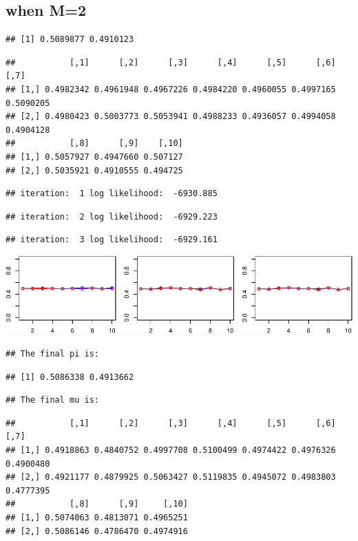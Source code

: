 \documentclass[
]{article}
\begin{document}
\hypertarget{when-m2}{%
\subsection{when M=2}\label{when-m2}}

\begin{verbatim}
## [1] 0.5089877 0.4910123
\end{verbatim}

\begin{verbatim}
##           [,1]      [,2]      [,3]      [,4]      [,5]      [,6]      [,7]
## [1,] 0.4982342 0.4961948 0.4967226 0.4984220 0.4960055 0.4997165 0.5090205
## [2,] 0.4980423 0.5003773 0.5053941 0.4988233 0.4936057 0.4994058 0.4904128
##           [,8]      [,9]    [,10]
## [1,] 0.5057927 0.4947660 0.507127
## [2,] 0.5035921 0.4910555 0.494725
\end{verbatim}

\begin{verbatim}
## iteration:  1 log likelihood:  -6930.885
\end{verbatim}

\begin{verbatim}
## iteration:  2 log likelihood:  -6929.223
\end{verbatim}

\begin{verbatim}
## iteration:  3 log likelihood:  -6929.161
\end{verbatim}

\includegraphics{MLLab1block2-lepeng_files/figure-latex/Assignment2_5-1.pdf}

\begin{verbatim}
## The final pi is:
\end{verbatim}

\begin{verbatim}
## [1] 0.5086338 0.4913662
\end{verbatim}

\begin{verbatim}
## The final mu is:
\end{verbatim}

\begin{verbatim}
##           [,1]      [,2]      [,3]      [,4]      [,5]      [,6]      [,7]
## [1,] 0.4918863 0.4840752 0.4997708 0.5100499 0.4974422 0.4976326 0.4900480
## [2,] 0.4921177 0.4879925 0.5063427 0.5119835 0.4945072 0.4983803 0.4777395
##           [,8]      [,9]     [,10]
## [1,] 0.5074063 0.4813071 0.4965251
## [2,] 0.5086146 0.4786470 0.4974916
\end{verbatim}
\end{document}
